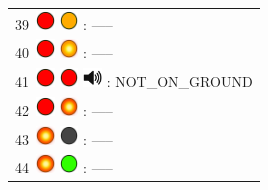 \documentclass[12pt, a4paper]{report}
\begin{document}
\begin{minipage}{0.45\textwidth}
\begin{Large}
\begin{tabular}{l}
		39\  \includegraphics*[width=5mm]{red_led} \includegraphics*[width=5mm]{orange_led} : -----\\
		
		40\  \includegraphics*[width=5mm]{red_led} \includegraphics*[width=5mm]{orange_led_flashing} : -----\\
		
		41\  \includegraphics*[width=5mm]{red_led} \includegraphics*[width=5mm]{red_led} \includegraphics*[width=5mm]{speaker} : NOT\_ON\_GROUND\\
		
		42\  \includegraphics*[width=5mm]{red_led} \includegraphics*[width=5mm]{red_led_flashing} : -----\\
		
		43\  \includegraphics*[width=5mm]{red_led_flashing} \includegraphics*[width=5mm]{off_led} : -----\\
		
		44\  \includegraphics*[width=5mm]{red_led_flashing} \includegraphics*[width=5mm]{green_led} : -----\\
		

\end{tabular}
\end{Large}
\end{minipage}
\end{document}
